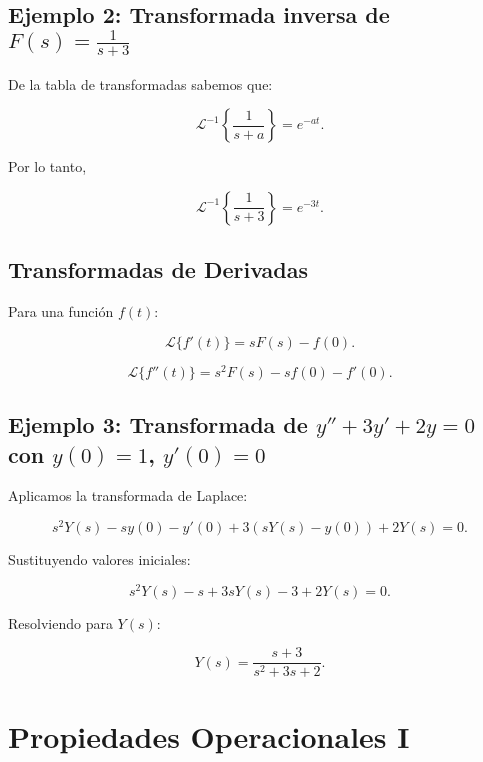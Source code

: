 \subsection*{Ejemplo 2: Transformada inversa de \( F(s) = \frac{1}{s+3} \)}
De la tabla de transformadas sabemos que:

\begin{equation}
\mathcal{L}^{-1} \left\{ \frac{1}{s+a} \right\} = e^{-at}.
\end{equation}

Por lo tanto,

\begin{equation}
\mathcal{L}^{-1} \left\{ \frac{1}{s+3} \right\} = e^{-3t}.
\end{equation}

\subsection{Transformadas de Derivadas}
Para una función \( f(t) \):

\begin{equation}
\mathcal{L} \{ f'(t) \} = s F(s) - f(0).
\end{equation}

\begin{equation}
\mathcal{L} \{ f''(t) \} = s^2 F(s) - s f(0) - f'(0).
\end{equation}

\subsection*{Ejemplo 3: Transformada de \( y'' + 3y' + 2y = 0 \) con \( y(0) = 1 \), \( y'(0) = 0 \)}
Aplicamos la transformada de Laplace:

\begin{equation}
s^2 Y(s) - sy(0) - y'(0) + 3(sY(s) - y(0)) + 2Y(s) = 0.
\end{equation}

Sustituyendo valores iniciales:

\begin{equation}
s^2 Y(s) - s + 3s Y(s) - 3 + 2Y(s) = 0.
\end{equation}

Resolviendo para \( Y(s) \):

\begin{equation}
Y(s) = \frac{s+3}{s^2 + 3s + 2}.
\end{equation}

\section{Propiedades Operacionales I}
